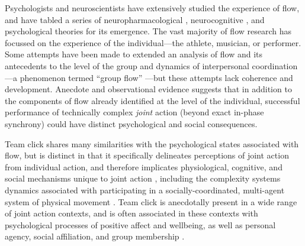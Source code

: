 \begin{CJK}{UTF8}{gbsn}
Psychologists and neuroscientists have extensively studied the experience of flow, and have tabled a series of neuropharmacological \citep{Boecker2008}, neurocognitive \citep{Dietrich2006,Dietrich2011,Labelle2013}, and psychological \citep{Csikszentmihalyi1992} theories for its emergence.  The vast majority of flow research has focussed on the experience of the individual---the athlete, musician, or performer.  Some attempts have been made to extended an analysis of flow and its antecedents to the level of the group and dynamics of interpersonal coordination---a phenomenon termed ``group flow'' \citep{Sawyer2006}---but these attempts lack coherence and development.  Anecdote and observational evidence suggests that in addition to the components of flow already identified at the level of the individual, successful performance of technically complex
\textit{joint} action (beyond exact in-phase synchrony) could have distinct psychological and social consequences.





  Team click shares many similarities with the psychological states associated with flow, but is distinct in that it specifically delineates perceptions of joint action from individual action, and therefore implicates physiological, cognitive, and social mechanisms unique to joint action \citep{Vesper2010}, including the complexity systems dynamics associated with participating in a socially-coordinated, multi-agent system of physical movement \citep{Kelso2009}.  Team click is anecdotally present in a wide range of joint action contexts, and is often associated in these contexts with psychological processes of positive affect and wellbeing, as well as personal agency, social affiliation, and group membership \citep{Jackson1995,Marsh2009,Wheatley2012,Slingerland2014}.



\end{CJK}
